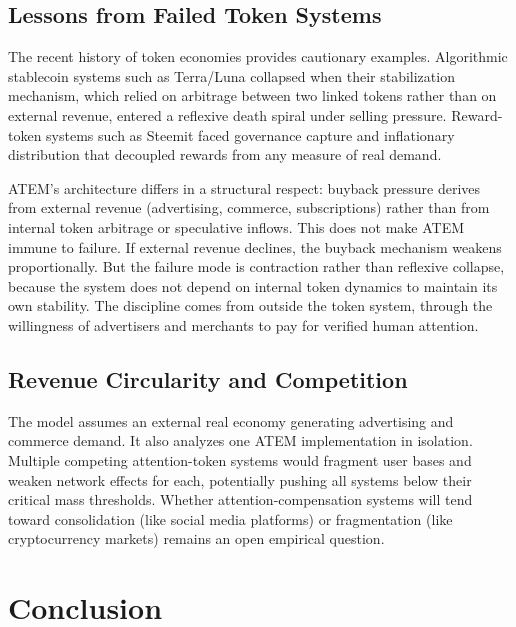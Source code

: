 \documentclass[12pt, a4paper]{article}
\begin{document}
\subsection{Lessons from Failed Token Systems}
\label{sec:limits-failures}

The recent history of token economies provides cautionary examples. Algorithmic stablecoin systems such as Terra/Luna collapsed when their stabilization mechanism, which relied on arbitrage between two linked tokens rather than on external revenue, entered a reflexive death spiral under selling pressure. Reward-token systems such as Steemit faced governance capture and inflationary distribution that decoupled rewards from any measure of real demand.

ATEM's architecture differs in a structural respect: buyback pressure derives from external revenue (advertising, commerce, subscriptions) rather than from internal token arbitrage or speculative inflows. This does not make ATEM immune to failure. If external revenue declines, the buyback mechanism weakens proportionally. But the failure mode is contraction rather than reflexive collapse, because the system does not depend on internal token dynamics to maintain its own stability. The discipline comes from outside the token system, through the willingness of advertisers and merchants to pay for verified human attention.

\subsection{Revenue Circularity and Competition}
\label{sec:limits-competition}

The model assumes an external real economy generating advertising and commerce demand. It also analyzes one ATEM implementation in isolation. Multiple competing attention-token systems would fragment user bases and weaken network effects for each, potentially pushing all systems below their critical mass thresholds. Whether attention-compensation systems will tend toward consolidation (like social media platforms) or fragmentation (like cryptocurrency markets) remains an open empirical question.


\section{Conclusion}
\label{sec:conclusion}
\end{document}
